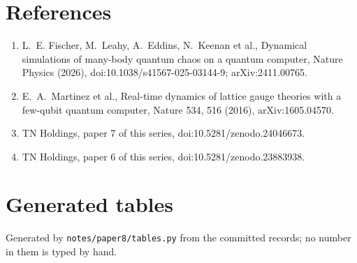 \documentclass[10pt,a4paper]{article}
\begin{document}
\section*{References}
\begin{enumerate}\small
\item L.~E. Fischer, M.~Leahy, A.~Eddins, N.~Keenan et al., Dynamical simulations of many-body quantum chaos on a
quantum computer, Nature Physics (2026), doi:10.1038/s41567-025-03144-9; arXiv:2411.00765.
\item E.~A.~Martinez et al., Real-time dynamics of lattice gauge theories with a few-qubit quantum computer, Nature
534, 516 (2016), arXiv:1605.04570.
\item TN Holdings, paper 7 of this series, doi:10.5281/zenodo.24046673.
\item TN Holdings, paper 6 of this series, doi:10.5281/zenodo.23883938.
\end{enumerate}

\appendix
\section{Generated tables}
Generated by \texttt{notes/paper8/tables.py} from the committed records; no number in them is typed by hand.
{\setlength{\tabcolsep}{3pt}
}
\end{document}
